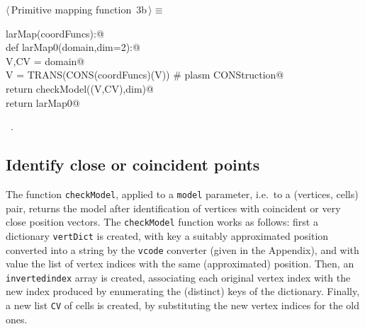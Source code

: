 \documentclass[11pt,oneside]{article}	%
\begin{document}
\begin{flushleft} \small \label{scrap3}
\protect{}$\langle\,$Primitive mapping function\nobreak\ {\footnotesize 3b}$\,\rangle\equiv$
\vspace{-1ex}
\begin{list}{}{} \item
\mbox{}\verb@def larMap(coordFuncs):@\\
\mbox{}\verb@   def larMap0(domain,dim=2):@\\
\mbox{}\verb@      V,CV = domain@\\
\mbox{}\verb@      V = TRANS(CONS(coordFuncs)(V))  # plasm CONStruction@\\
\mbox{}\verb@      return checkModel((V,CV),dim)@\\
\mbox{}\verb@   return larMap0@\\
\mbox{}\verb@@{\NWsep}
\end{list}
\vspace{-1ex}
\footnotesize\addtolength{\baselineskip}{-1ex}
\begin{list}{}{\setlength{\itemsep}{-\parsep}\setlength{\itemindent}{-\leftmargin}}
\item \NWtxtMacroRefIn\ .
\end{list}
\end{flushleft}

\subsection{Identify close or coincident points}

The function \texttt{checkModel}, applied to a \texttt{model} parameter, i.e.~to a (vertices, cells)  pair, returns the model after identification of vertices with coincident or very close position vectors.
The \texttt{checkModel} function works as follows: first a dictionary \texttt{vertDict} is created, with key a suitably approximated position converted into a string by the \texttt{vcode} converter (given in the Appendix), and with value the list of vertex indices with the same (approximated) position. Then, an \texttt{invertedindex} array is created, associating each original vertex index with the new index produced by enumerating the (distinct) keys of the dictionary. Finally, a new list \texttt{CV} of cells is created, by substituting the new vertex indices for the old ones. 
\end{document}
